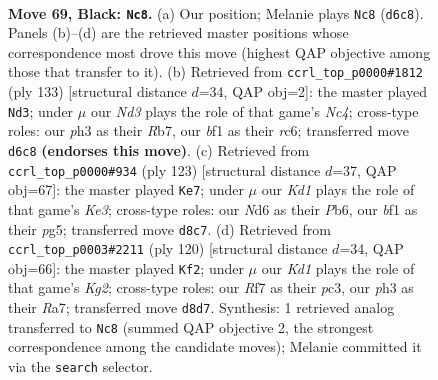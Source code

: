 \documentclass[11pt]{article}
\begin{document}
\clearpage

\begin{figure}[p]\centering
\begin{subfigure}{0.46\textwidth}\centering
\resizebox{\linewidth}{!}{%
\newchessgame
\chessboard[
  setfen={R2k4/5r1p/P2n4/2P5/8/2p4P/2P1K1P1/5B2 b - - 2 69},
  showmover=false,
  pgfstyle=straightmove, color=movearrow, markmove={d6-c8}
]}
\caption{}
\end{subfigure}\hfill
\begin{subfigure}{0.46\textwidth}\centering
\resizebox{\linewidth}{!}{%
\newchessgame
\chessboard[
  setfen={5r1k/1r6/2R3P1/1BnP4/P3p3/4N3/8/6K1 b - - 4 67},
  showmover=false,
  pgfstyle=straightmove, color=movearrow, markmove={c5-d3}
]}
\caption{}
\end{subfigure}
\\[4pt]
\begin{subfigure}{0.46\textwidth}\centering
\resizebox{\linewidth}{!}{%
\newchessgame
\chessboard[
  setfen={8/8/1p2k2R/p2r2P1/P4B2/1P6/2K5/3n4 b - - 10 62},
  showmover=false,
  pgfstyle=straightmove, color=movearrow, markmove={e6-e7}
]}
\caption{}
\end{subfigure}\hfill
\begin{subfigure}{0.46\textwidth}\centering
\resizebox{\linewidth}{!}{%
\newchessgame
\chessboard[
  setfen={8/R1Rb4/3P3k/5pr1/1p2p3/2p1P3/6K1/8 w - - 0 61},
  showmover=false,
  pgfstyle=straightmove, color=movearrow, markmove={g2-f2}
]}
\caption{}
\end{subfigure}
\caption{\textbf{Move 69, Black: \texttt{Nc8}.} (a) Our position; Melanie plays \texttt{Nc8} (\texttt{d6c8}). Panels (b)--(d) are the retrieved master positions whose correspondence most drove this move (highest QAP objective among those that transfer to it). (b) Retrieved from \texttt{ccrl\_top\_p0000\#1812} (ply 133) [structural distance $d$=34, QAP obj=2]: the master played \texttt{Nd3}; under $\mu$ our \emph{Nd3} plays the role of that game's \emph{Nc4}; cross-type roles: our \emph{p}h3 as their \emph{R}b7, our \emph{b}f1 as their \emph{r}c6; transferred move \texttt{d6c8} \textbf{(endorses this move)}. (c) Retrieved from \texttt{ccrl\_top\_p0000\#934} (ply 123) [structural distance $d$=37, QAP obj=67]: the master played \texttt{Ke7}; under $\mu$ our \emph{Kd1} plays the role of that game's \emph{Ke3}; cross-type roles: our \emph{N}d6 as their \emph{P}b6, our \emph{b}f1 as their \emph{p}g5; transferred move \texttt{d8c7}. (d) Retrieved from \texttt{ccrl\_top\_p0003\#2211} (ply 120) [structural distance $d$=34, QAP obj=66]: the master played \texttt{Kf2}; under $\mu$ our \emph{Kd1} plays the role of that game's \emph{Kg2}; cross-type roles: our \emph{R}f7 as their \emph{p}c3, our \emph{p}h3 as their \emph{R}a7; transferred move \texttt{d8d7}. Synthesis: 1 retrieved analog transferred to \texttt{Nc8} (summed QAP objective 2, the strongest correspondence among the candidate moves); Melanie committed it via the \texttt{search} selector.}
\label{fig:thought-m137}
\end{figure}
\end{document}
